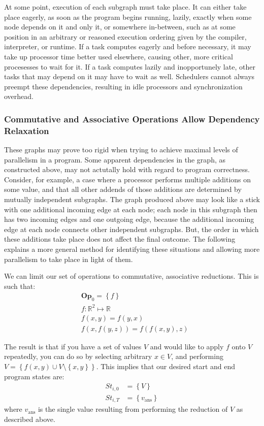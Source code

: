 \documentclass[pageno]{jpaper}
\newcommand{\Op}{\mathrm{\mathbf{Op}}}
\begin{document}
At some point, execution of each subgraph must take place. It can either take
place eagerly, as soon as the program begins running, lazily, exactly when some
node depends on it and only it, or somewhere in-between, such as at some
position in an arbitrary or reasoned execution ordering given by the compiler,
interpreter, or runtime. If a task computes
eagerly and before necessary, it may take up processor time better used
elsewhere, causing other, more critical procesesses to wait for it. If a task
computes lazily and inopportunely late, other tasks that may depend on it may
have to wait as well. Schedulers cannot
always preempt these dependencies, resulting in idle processors and
synchronization overhead.

\subsubsection{Commutative and Associative Operations Allow Dependency Relaxation}
These graphs may prove too rigid when trying to achieve maximal levels of
parallelism in a program. Some apparent dependencies in the graph, as
constructed above, may not actutally hold with regard to program correctness.
Consider, for example, a case where a processor performs multiple additions on
some value, and that all other addends of those additions are determined by
mutually independent subgraphs. The graph produced above may look like a stick
with one additional incoming edge at each node; each node in this subgraph then
has two incoming edges and one outgoing edge, because the additional incoming
edge at each node connects other independent subgraphs. But, the order in which
these additions take place does not affect the final outcome. The following
explains a more general method for identifying these situations and allowing
more parallelism to take place in light of them.

We can limit our set of operations to commutative, associative reductions.
This is such that:
\begin{align}
    & \Op_0 = \left\{f\right\}  \\
    & f: \mathbb{R}^2 \mapsto \mathbb{R}  \\
    & f(x,y) = f(y,x)  \\
    & f(x,f(y,z)) = f(f(x,y),z) 
\end{align}

The result is that if you have a set of values $V$ and would like to apply $f$
onto $V$ repeatedly, you can do so by selecting arbitrary $x \in V$, and
performing $V = \left\{ f(x,y) \cup V \setminus \left\{ x, y \right\}
\right\}$.  This implies that our desired start and end program states are:
\begin{align*}
    St_{i,0} &= \left\{ V \right\}  \\
    St_{i,T} &= \left\{ v_\text{ans} \right\}
\end{align*}
where $v_\text{ans}$ is the single value resulting from performing the reduction
of $V$ as described above.
\end{document}
